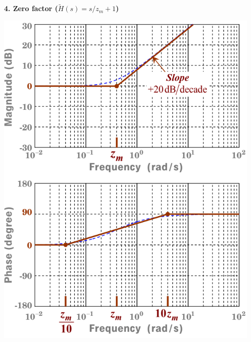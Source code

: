 \documentclass[landscape,a4paper]{extarticle}
\newenvironment{Figure}
  {\par\medskip\noindent\minipage{\linewidth}}
  {\endminipage\par\medskip}
\begin{document}
\begin{multicols*}{5}
    \textbf{4. Zero factor ($\tilde{H}(s) = s/z_m + 1$)}
    \begin{Figure}
        \centering
        \includegraphics[width=\linewidth]{bode_zeroFactor.png}        
    \end{Figure}


\end{multicols*}
\end{document}
